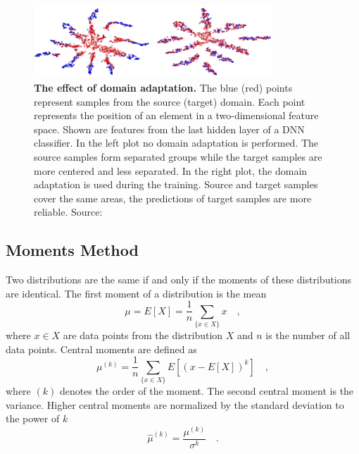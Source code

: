 \begin{figure}
\centering
\includegraphics[width=0.8\textwidth]{assets/DomainAdaptation.png}
\caption[The Effect of Domain Adaptation]{\textbf{The effect of domain adaptation.} The blue (red) points represent samples from the source (target) domain. Each point represents the position of an element in a two-dimensional feature space. Shown are features from the last hidden layer of a DNN classifier. In the left plot no domain adaptation is performed. The source samples form separated groups while the target samples are more centered and less separated. In the right plot, the domain adaptation is used during the training. Source and target samples cover the same areas, the predictions of target samples are more reliable. Source: \cite{DA_Adversarial}}
\label{fig:ch_4_DomainAdaptation}
\end{figure}

\subsection{Moments Method}
Two distributions are the same if and only if the moments of these distributions are identical. The first moment of a distribution is the mean
\begin{equation}
\mu = E[X] = \frac{1}{n}\sum_{\{x \in X\}} x \quad ,
\end{equation}
where $x \in X$ are data points from the distribution $X$ and $n$ is the number of all data points. Central moments are defined as 
\begin{equation}
\mu^{(k)} = \frac{1}{n} \sum_{\{x \in X\}} E\left[\left(x-E[X]\right)^k\right] \quad ,
\end{equation}
where $(k)$ denotes the order of the moment. The second central moment is the variance. Higher central moments are normalized by the standard deviation to the power of $k$
\begin{equation}
\hat{\mu}^{(k)} = \frac{\mu^{(k)}}{\sigma^k} \quad .
\end{equation}

